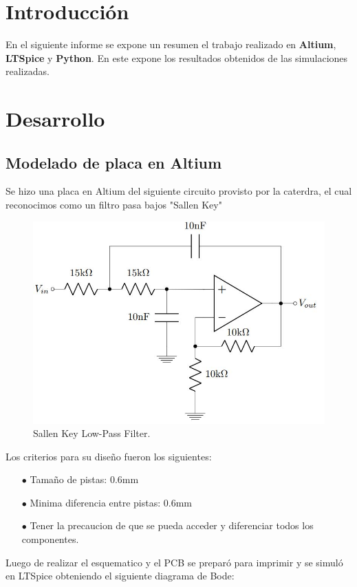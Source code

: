 \documentclass[a4paper]{article}
\begin{document}




\section*{Introducción}

En el siguiente informe se expone un resumen el trabajo realizado en \textbf{Altium}, \textbf{LTSpice} y \textbf{Python}. En este expone los resultados obtenidos de las simulaciones realizadas.

\section*{Desarrollo}

\subsection*{Modelado de placa en Altium}
Se hizo una placa en Altium del siguiente circuito provisto por la caterdra, el cual reconocimos como un filtro pasa bajos "Sallen Key"


\begin{figure}[H]
	\centering
	\includegraphics[width=\textwidth]{Altium}
	\caption{Sallen Key Low-Pass Filter.}
	\label{fig:LTSD1}
\end{figure}
Los criterios para su diseño fueron los siguientes:
\begin{itemize}
\item[$\bullet$]Tamaño de pistas: 0.6mm
\item[$\bullet$]Minima diferencia entre pistas: 0.6mm
\item[$\bullet$]Tener la precaucion de que se pueda acceder y diferenciar todos los componentes.
\end{itemize} 
Luego de realizar el esquematico y el PCB se preparó para imprimir y se simuló en LTSpice obteniendo el siguiente diagrama de Bode:
\end{document}
